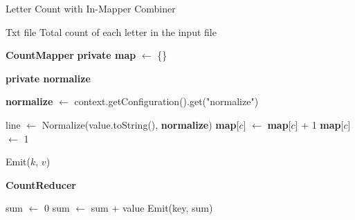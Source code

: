 \begin{algorithm}[H]
    \caption{Letter Count with In-Mapper Combiner}
    \begin{algorithmic}[1]
    \Require Txt file
    \Ensure Total count of each letter in the input file
    
    \Statex
    \noindent \textbf{CountMapper}
        \State \textbf{private map} $\leftarrow$ \{\}
        
        \State \textbf{private normalize}
    
            \State \textbf{normalize} $\leftarrow$ context.getConfiguration().get("normalize")
        \EndProcedure
    
            \State line $\leftarrow$ Normalize(value.toString(), \textbf{normalize})
                        \State \textbf{map}[$c$] $\leftarrow$ \textbf{map}[$c$] + 1
                    \Else
                        \State \textbf{map}[$c$] $\leftarrow$ 1
                    \EndIf
                \EndIf
            \EndFor
        \EndProcedure
    
                \State Emit($k$, $v$)
            \EndFor
        \EndProcedure
    
        \vspace{1em}

    \Statex
    \noindent \textbf{CountReducer}

    
            \State sum $\leftarrow$ 0
                \State sum $\leftarrow$ sum + value
            \EndFor
            \State Emit(key, sum)
        \EndProcedure

    \end{algorithmic}
    \end{algorithm}
    
